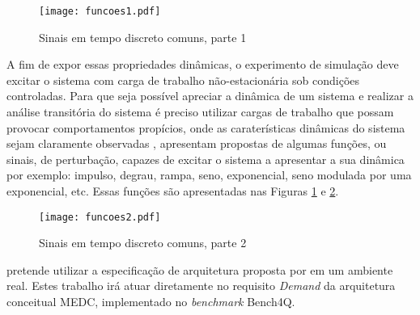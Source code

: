 \begin{figure}[!htb]
	\centering
	\texttt{[image: funcoes1.pdf]}
	\caption{Sinais em tempo discreto comuns, parte 1}
	\label{fig:funcoes1}
\end{figure}

A fim de expor essas propriedades dinâmicas, o experimento de simulação deve excitar o sistema com carga de trabalho não-estacionária sob condições controladas. Para que seja possível apreciar a dinâmica de um sistema e realizar a análise transitória do sistema é preciso utilizar cargas de trabalho que possam provocar comportamentos propícios, onde as caraterísticas dinâmicas do sistema sejam claramente observadas , apresentam propostas de algumas funções, ou sinais, de perturbação, capazes de excitar o sistema a apresentar a sua dinâmica por exemplo: impulso, degrau, rampa, seno, exponencial, seno modulada por uma exponencial, etc.  Essas funções são apresentadas nas Figuras \ref{fig:funcoes1} e \ref{fig:funcoes2}.

\begin{figure}[!htb]
	\centering
	\texttt{[image: funcoes2.pdf]}
	\caption{Sinais em tempo discreto comuns, parte 2}
	\label{fig:funcoes2}
\end{figure}

 pretende utilizar a especificação de arquitetura proposta por  em um ambiente real. Estes trabalho irá atuar diretamente no requisito \textit{Demand} da arquitetura conceitual MEDC, implementado no \textit{benchmark} Bench4Q.



